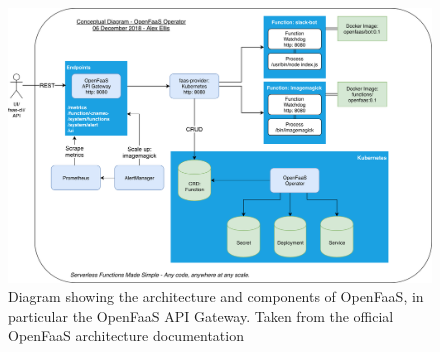 \documentclass[draft,final]{vutinfth} %
\begin{document}
\begin{figure}
    \centering
    \includegraphics[width=14cm]{graphics/diagrams/openfaas-gateway-architecture.png}
    \caption{Diagram showing the architecture and components of OpenFaaS, in particular the OpenFaaS API Gateway. Taken from the official OpenFaaS architecture documentation\cite{openfaas-gateway}}
    \label{fig:openfaas-gateway-diagram}
\end{figure}
\end{document}
